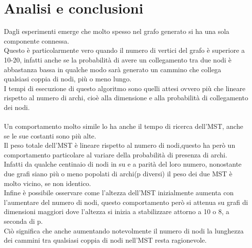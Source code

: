 \documentclass[]{article}
\begin{document}
\section{Analisi e conclusioni}
Dagli esperimenti emerge che molto spesso nel grafo generato si ha una sola componente connessa.\\
Questo è particolarmente vero quando il numero di vertici del grafo è superiore a 10-20, infatti anche se la probabilità di avere un collegamento tra due nodi è abbastanza bassa in qualche modo sarà generato un cammino che collega qualsiasi coppia di nodi, più o meno lungo.\\
I tempi di esecuzione di questo algoritmo sono quelli attesi ovvero più che lineare rispetto al numero di archi, cioè alla dimensione e alla probabilità di collegamento dei nodi.\\
\\
Un comportamento molto simile lo ha anche il tempo di ricerca dell'MST, anche se le sue costanti sono più alte.\\
Il peso totale dell'MST è lineare rispetto al numero di nodi,questo ha però un comportamento particolare al variare della probabilità di presenza di archi.\\
Infatti da qualche centinaio di nodi in su e a parità del loro numero, nonostante due grafi siano più o meno popolati di archi(p diversi) il peso dei due MST è molto vicino, se non identico.\\
Infine è possibile osservare come l'altezza dell'MST inizialmente aumenta con l'aumentare del numero di nodi, questo comportamento però si attenua su grafi di dimensioni maggiori dove l'altezza si inizia a stabilizzare attorno a 10 o 8, a seconda di p.\\
Ciò significa che anche aumentando notevolmente il numero di nodi la lunghezza dei cammini  tra qualsiasi coppia di nodi nell'MST resta ragionevole.\\
 
\end{document}
